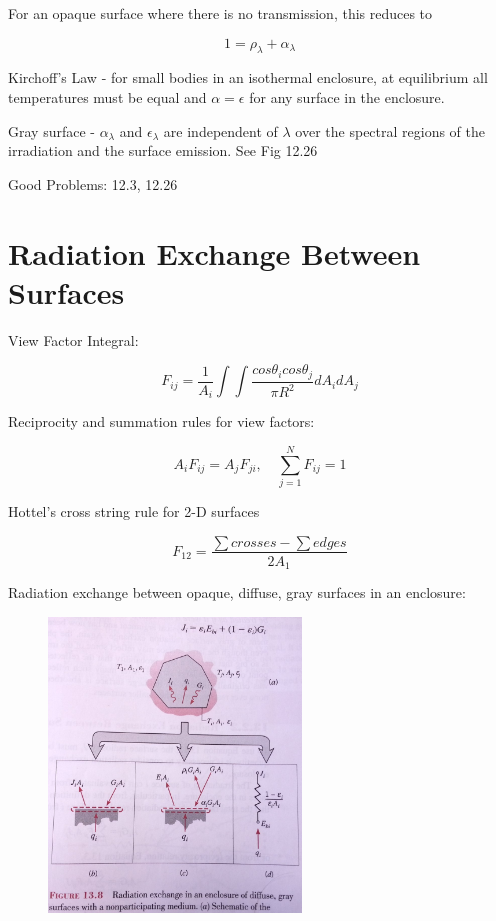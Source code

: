 \documentclass[paper=letter, fontsize=11pt]{scrartcl}
\numberwithin{equation}{section}        %
\numberwithin{figure}{section}          %
\numberwithin{table}{section}               %
\begin{document}
For an opaque surface where there is no transmission, this reduces to

\begin{equation}
1 = \rho_\lambda + \alpha_\lambda
\end{equation}

Kirchoff’s Law - for small bodies in an isothermal enclosure, at equilibrium all temperatures must be equal and $\alpha=\epsilon$ for any surface in the enclosure.

Gray surface - $\alpha_\lambda$ and $\epsilon_\lambda$ are independent of $\lambda$ over the spectral regions of the irradiation and the surface emission. See Fig 12.26

\bigskip Good Problems: 12.3, 12.26


\section{Radiation Exchange Between Surfaces}

View Factor Integral:

\begin{equation}
F_{ij} = \frac{1}{A_i}\int\int\frac{cos\theta_icos\theta_j}{\pi R^2}dA_idA_j
\end{equation}

Reciprocity and summation rules for view factors:

\begin{equation}
A_i F_{ij} = A_j F_{ji},\quad \sum_{j=1}^N F_{ij} = 1
\end{equation}

Hottel’s cross string rule for 2-D surfaces

\begin{equation}
F_{12} = \frac{\sum crosses-\sum edges}{2A_1}
\end{equation}

Radiation exchange between opaque, diffuse, gray surfaces in an enclosure:

\begin{figure}[!ht]
\centering
\includegraphics[width=0.6\textwidth]{./Figures/radiation_surface}
\end{figure}
\end{document}
